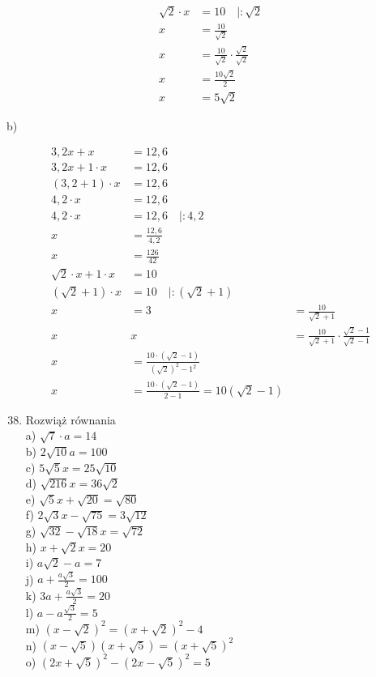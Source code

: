 \documentclass[10pt]{article}
\begin{document}
\[
\begin{aligned}
\sqrt{2} \cdot x & =10 \quad \mid: \sqrt{2} \\
x & =\frac{10}{\sqrt{2}} \\
x & =\frac{10}{\sqrt{2}} \cdot \frac{\sqrt{2}}{\sqrt{2}} \\
x & =\frac{10 \sqrt{2}}{2} \\
x & =5 \sqrt{2}
\end{aligned}
\]

b)

\[
\begin{array}{rl|l}
3,2 x+x & =12,6 \\
3,2 x+1 \cdot x & =12,6 \\
(3,2+1) \cdot x & =12,6 \\
4,2 \cdot x & =12,6 \\
4,2 \cdot x & =12,6 \quad \mid: 4,2 \\
x & =\frac{12,6}{4,2} \\
x & =\frac{126}{42} \\
\sqrt{2} \cdot x+1 \cdot x & =10 \\
(\sqrt{2}+1) \cdot x & =10 \quad \mid:(\sqrt{2}+1) \\
x & =3 & =\frac{10}{\sqrt{2}+1} \\
x & x & =\frac{10}{\sqrt{2}+1} \cdot \frac{\sqrt{2}-1}{\sqrt{2}-1} \\
x & =\frac{10 \cdot(\sqrt{2}-1)}{(\sqrt{2})^{2}-1^{2}} \\
x & =\frac{10 \cdot(\sqrt{2}-1)}{2-1}=10(\sqrt{2}-1)
\end{array}
\]

\begin{enumerate}
  \setcounter{enumi}{37}
  \item Rozwiąż równania\\
a) \(\sqrt{7} \cdot a=14\)\\
b) \(2 \sqrt{10} a=100\)\\
c) \(5 \sqrt{5} x=25 \sqrt{10}\)\\
d) \(\sqrt{216} x=36 \sqrt{2}\)\\
e) \(\sqrt{5} x+\sqrt{20}=\sqrt{80}\)\\
f) \(2 \sqrt{3} x-\sqrt{75}=3 \sqrt{12}\)\\
g) \(\sqrt{32}-\sqrt{18} x=\sqrt{72}\)\\
h) \(x+\sqrt{2} x=20\)\\
i) \(a \sqrt{2}-a=7\)\\
j) \(a+\frac{a \sqrt{3}}{2}=100\)\\
k) \(3 a+\frac{a \sqrt{3}}{2}=20\)\\
l) \(a-a \frac{\sqrt{3}}{2}=5\)\\
m) \((x-\sqrt{2})^{2}=(x+\sqrt{2})^{2}-4\)\\
n) \((x-\sqrt{5})(x+\sqrt{5})=(x+\sqrt{5})^{2}\)\\
o) \((2 x+\sqrt{5})^{2}-(2 x-\sqrt{5})^{2}=5\)
\end{enumerate}
\end{document}
